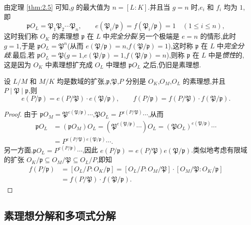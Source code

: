 由定理 \ref{thm:2.5} 可知,$g$ 的最大值为 $n=[L:K]$.并且当 $g=n$ 时,$e_i$ 和 $f_i$ 均为 $1$,即
\[
  \mathfrak{p}O_L=\mathfrak{P}_1\mathfrak{P}_2\cdots\mathfrak{P}_n,\qquad
  e(\mathfrak{P}_i/\mathfrak{p})=f(\mathfrak{P}_i/\mathfrak{p})=1\quad (1\leqslant i\leqslant n),
\]
这时我们称 $O_K$ 的素理想 $\mathfrak{p}$ 在 $L$ 中\emph{完全分裂}.另一个极端是 $e=n$ 的情形,此时 $g=1$,于是 $\mathfrak{p}O_L=\mathfrak{P}^n$(从而 $e(\mathfrak{P}/\mathfrak{p})=n$,$f(\mathfrak{P}/\mathfrak{p})=1$),这时称 $\mathfrak{p}$ 在 $L$ 中\emph{完全分歧}.最后,若 $\mathfrak{p}O_L=\mathfrak{P}$($g=1$,$e(\mathfrak{P}/\mathfrak{p})=1$,$f(\mathfrak{P}/\mathfrak{p})=n$),则称 $\mathfrak{p}$ 在 $L$ 中是\emph{惯性}的,这是因为 $O_K$ 中素理想扩充成 $O_L$ 中理想 $\mathfrak{p}O_L$ 之后,仍旧是素理想.

\begin{theorem}\label{thm:2.6}
设 $L/M$ 和 $M/K$ 均是数域的扩张,$\mathfrak{p}$,$\mathfrak{P}$,$P$ 分别是 $O_K$,$O_M$,$O_L$ 的素理想,并且 $P\mid\mathfrak{P}\mid\mathfrak{p}$,则
\[
  e(P/\mathfrak{p})=e(P/\mathfrak{P})\cdot e(\mathfrak{P}/\mathfrak{p}),\qquad
  f(P/\mathfrak{p})=f(P/\mathfrak{P})\cdot f(\mathfrak{P}/\mathfrak{p}).
\]
\end{theorem}

\begin{proof}
由于 $\mathfrak{p}O_M=\mathfrak{P}^{e(\mathfrak{P}/\mathfrak{p})}\cdots$,$\mathfrak{P}O_L=P^{e(P/\mathfrak{P})}\cdots$,从而
\begin{align*}
  \mathfrak{p}O_L&=(\mathfrak{p}O_M)O_L=(\mathfrak{P}^{e(\mathfrak{P}/\mathfrak{p})}\cdots)O_L
  =(\mathfrak{P}O_L)^{e(\mathfrak{P}/\mathfrak{p})}\cdots\\
  &=P^{e(P/\mathfrak{P})e(\mathfrak{P}/\mathfrak{p})}\cdots.
\end{align*}
另一方面,$\mathfrak{p}O_L=P^{e(P/\mathfrak{p})}\cdots$,因此 $e(P/\mathfrak{p})=e(P/\mathfrak{P})e(\mathfrak{P}/\mathfrak{p})$.类似地考虑有限域的扩张 $O_K/\mathfrak{p}\subseteq O_M/\mathfrak{P}\subseteq O_L/P$,即知
\begin{align*}
  f(P/\mathfrak{p})&=[O_L/P:O_K/\mathfrak{p}]
  =[O_L/P:O_M/\mathfrak{P}]\cdot[O_M/\mathfrak{P}:O_K/\mathfrak{p}]\\
  &=f(P/\mathfrak{P})\cdot f(\mathfrak{P}/\mathfrak{p}).
\end{align*}
\end{proof}

\subsection{素理想分解和多项式分解}\label{sec:ch2-s2-2}

